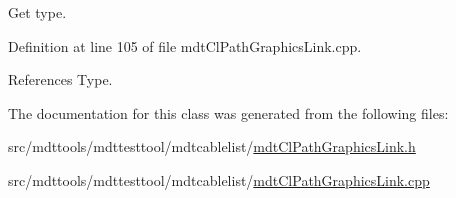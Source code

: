Get type. 



Definition at line 105 of file mdt\-Cl\-Path\-Graphics\-Link.\-cpp.



References Type.



The documentation for this class was generated from the following files\-:\begin{DoxyCompactItemize}
\item 
src/mdttools/mdttesttool/mdtcablelist/\hyperlink{mdt_cl_path_graphics_link_8h}{mdt\-Cl\-Path\-Graphics\-Link.\-h}\item 
src/mdttools/mdttesttool/mdtcablelist/\hyperlink{mdt_cl_path_graphics_link_8cpp}{mdt\-Cl\-Path\-Graphics\-Link.\-cpp}\end{DoxyCompactItemize}
